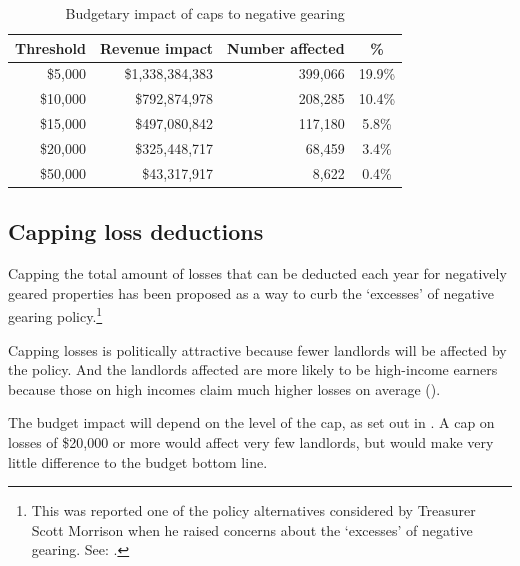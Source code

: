 \documentclass{grattanAlpha}\usepackage[]{graphicx}\usepackage[]{color}
\begin{document}
\begin{table}
\caption{Budgetary impact of caps to negative gearing}\label{tbl:cap-NG}
\begin{tabularx}{\linewidth}{rRRS}
  \toprule
{\textbf{Threshold}} & {\textbf{Revenue impact}} & {\textbf{Number affected}} & {\textbf{\%}} \\ 
  \midrule
  \$5,000 & \$1,338,384,383 & 399,066 & 19.9\% \\ 
  \$10,000 & \$792,874,978 & 208,285 & 10.4\% \\ 
  \$15,000 & \$497,080,842 & 117,180 & 5.8\% \\ 
  \$20,000 & \$325,448,717 & 68,459 & 3.4\% \\ 
  \$50,000 & \$43,317,917 & 8,622 & 0.4\% \\ 
   \bottomrule
\end{tabularx}

\end{table}

\subsection{Capping loss deductions}
Capping the total amount of losses that can be deducted each year for negatively geared properties has been proposed as a way to curb the ‘excesses’ of negative gearing policy.\footnote{This was reported one of the policy alternatives considered by Treasurer Scott Morrison when he raised concerns about the ‘excesses’ of negative gearing. See: \textcite{Coorey2016}.}



Capping losses is politically attractive because fewer landlords will be affected by the policy. 
And the landlords affected are more likely to be high-income earners because those on high incomes claim much higher losses on average (). 

The budget impact will depend on the level of the cap, as set out in . A cap on losses of \$20,000 or more would affect very few landlords, but would make very little difference to the budget bottom line.
\end{document}
